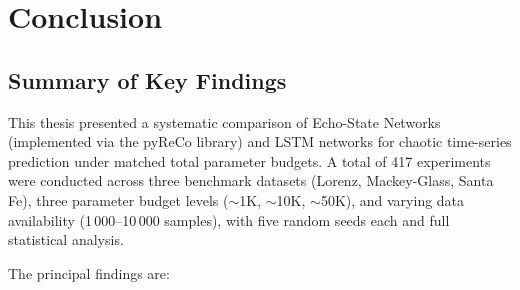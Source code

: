\section{Conclusion\label{chapter6}}

\subsection{Summary of Key Findings}
\label{sec:summary}

This thesis presented a systematic comparison of Echo-State Networks (implemented via the pyReCo library) and LSTM networks for chaotic time-series prediction under matched total parameter budgets. A total of 417 experiments were conducted across three benchmark datasets (Lorenz, Mackey-Glass, Santa Fe), three parameter budget levels (${\sim}$1K, ${\sim}$10K, ${\sim}$50K), and varying data availability (1\,000--10\,000 samples), with five random seeds each and full statistical analysis.

The principal findings are:

